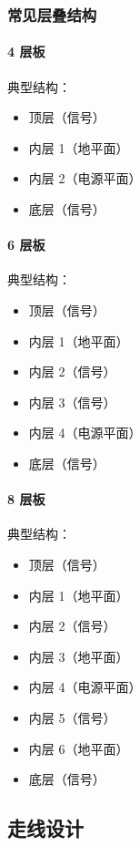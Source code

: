 \subsubsection{常见层叠结构}

\paragraph{4 层板}

典型结构：
\begin{itemize}
  \item 顶层（信号）
  \item 内层 1（地平面）
  \item 内层 2（电源平面）
  \item 底层（信号）
\end{itemize}

\paragraph{6 层板}

典型结构：
\begin{itemize}
  \item 顶层（信号）
  \item 内层 1（地平面）
  \item 内层 2（信号）
  \item 内层 3（信号）
  \item 内层 4（电源平面）
  \item 底层（信号）
\end{itemize}

\paragraph{8 层板}

典型结构：
\begin{itemize}
  \item 顶层（信号）
  \item 内层 1（地平面）
  \item 内层 2（信号）
  \item 内层 3（地平面）
  \item 内层 4（电源平面）
  \item 内层 5（信号）
  \item 内层 6（地平面）
  \item 底层（信号）
\end{itemize}

\subsection{走线设计}

